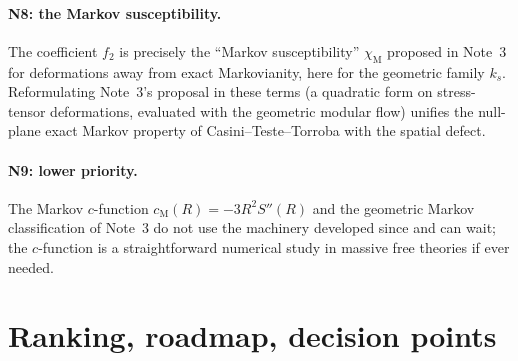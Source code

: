 \documentclass[11pt]{article}
\theoremstyle{accent}
\theoremstyle{definition}
\begin{document}
\paragraph{N8: the Markov susceptibility.}
The coefficient \(f_2\) is precisely the ``Markov susceptibility'' \(\chi_{\mathrm M}\) proposed in Note~3 for deformations away from exact Markovianity, here for the geometric family \(k_s\).  Reformulating Note~3's proposal in these terms (a quadratic form on stress-tensor deformations, evaluated with the geometric modular flow) unifies the null-plane exact Markov property of Casini--Teste--Torroba with the spatial defect.

\paragraph{N9: lower priority.}
The Markov \(c\)-function \(c_{\mathrm M}(R)=-3R^2S''(R)\) and the geometric Markov classification of Note~3 do not use the machinery developed since and can wait; the \(c\)-function is a straightforward numerical study in massive free theories if ever needed.
\section{Ranking, roadmap, decision points}\label{sec:ranking}
\end{document}

